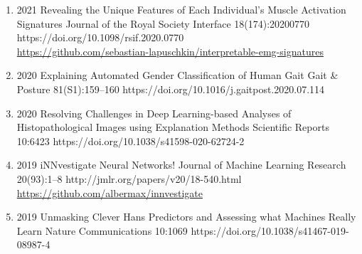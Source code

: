 {\begin{enumerate}
    \item {}
                        {2021}
                        {Revealing the Unique Features of Each Individual's Muscle Activation Signatures}
                        {Journal of the Royal Society Interface}
                        {18(174):20200770}
                        {https://doi.org/10.1098/rsif.2020.0770}
                        {\\\href{https://github.com/sebastian-lapuschkin/interpretable-emg-signatures}{https://github.com/sebastian-lapuschkin/interpretable-emg-signatures}}

    \item {}
                        {2020}
                        {Explaining Automated Gender Classification of Human Gait}
                        {Gait \& Posture}
                        {81(S1):159--160}
                        {https://doi.org/10.1016/j.gaitpost.2020.07.114}

    \item {}
                        {2020}
                        {Resolving Challenges in Deep Learning-based Analyses of Histopathological Images using Explanation Methods}
                        {Scientific Reports}
                        {10:6423}
                        {https://doi.org/10.1038/s41598-020-62724-2}

    \item {}
                        {2019}
                        {iNNvestigate Neural Networks!}
                        {Journal of Machine Learning Research}
                        {20(93):1--8}
                        {http://jmlr.org/papers/v20/18-540.html}
                        {\\\href{https://github.com/albermax/innvestigate}{https://github.com/albermax/innvestigate}}

    \item {}
                        {2019}
                        {Unmasking Clever Hans Predictors and Assessing what Machines Really Learn}
                        {Nature Communications}
                        {10:1069}
                        {https://doi.org/10.1038/s41467-019-08987-4}


\end{enumerate}}
